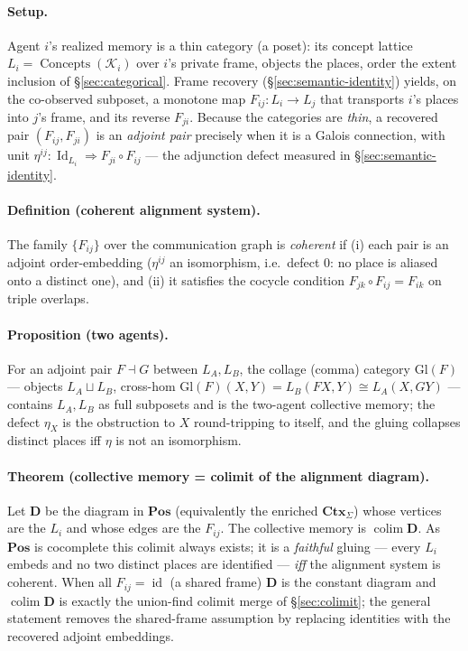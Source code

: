\documentclass{article}
\begin{document}
\paragraph{Setup.} Agent $i$'s realized memory is a thin category (a poset):
its concept lattice $L_i=\operatorname{Concepts}(\mathcal{K}_i)$ over $i$'s
private frame, objects the places, order the extent inclusion of
\S\ref{sec:categorical}. Frame recovery (\S\ref{sec:semantic-identity}) yields,
on the co-observed subposet, a monotone map $F_{ij}:L_i\to L_j$ that transports
$i$'s places into $j$'s frame, and its reverse $F_{ji}$. Because the categories
are \emph{thin}, a recovered pair $(F_{ij},F_{ji})$ is an \emph{adjoint pair}
precisely when it is a Galois connection, with unit
$\eta^{ij}:\operatorname{Id}_{L_i}\Rightarrow F_{ji}\!\circ\!F_{ij}$ --- the
adjunction defect measured in \S\ref{sec:semantic-identity}.

\paragraph{Definition (coherent alignment system).} The family $\{F_{ij}\}$
over the communication graph is \emph{coherent} if (i) each pair is an adjoint
order-embedding ($\eta^{ij}$ an isomorphism, i.e.\ defect $0$: no place is
aliased onto a distinct one), and (ii) it satisfies the cocycle condition
$F_{jk}\!\circ\!F_{ij}=F_{ik}$ on triple overlaps.

\paragraph{Proposition (two agents).} For an adjoint pair $F\dashv G$ between
$L_A,L_B$, the collage (comma) category $\mathrm{Gl}(F)$ --- objects
$L_A\sqcup L_B$, cross-hom $\mathrm{Gl}(F)(X,Y)=L_B(FX,Y)\cong L_A(X,GY)$
\citep{maclane1998categories} --- contains $L_A,L_B$ as full subposets and is
the two-agent collective memory; the defect $\eta_X$ is the obstruction to $X$
round-tripping to itself, and the gluing collapses distinct places iff $\eta$
is not an isomorphism.

\paragraph{Theorem (collective memory = colimit of the alignment diagram).}
Let $\mathbf{D}$ be the diagram in $\mathbf{Pos}$ (equivalently the enriched
$\mathbf{Ctx}_\Sigma$) whose vertices are the $L_i$ and whose edges are the
$F_{ij}$. The collective memory is $\operatorname{colim}\mathbf{D}$. As
$\mathbf{Pos}$ is cocomplete this colimit always exists; it is a \emph{faithful}
gluing --- every $L_i$ embeds and no two distinct places are identified ---
\emph{iff} the alignment system is coherent. When all $F_{ij}=\operatorname{id}$
(a shared frame) $\mathbf{D}$ is the constant diagram and
$\operatorname{colim}\mathbf{D}$ is exactly the union-find colimit merge of
\S\ref{sec:colimit}; the general statement removes the shared-frame assumption
by replacing identities with the recovered adjoint embeddings.
\end{document}
